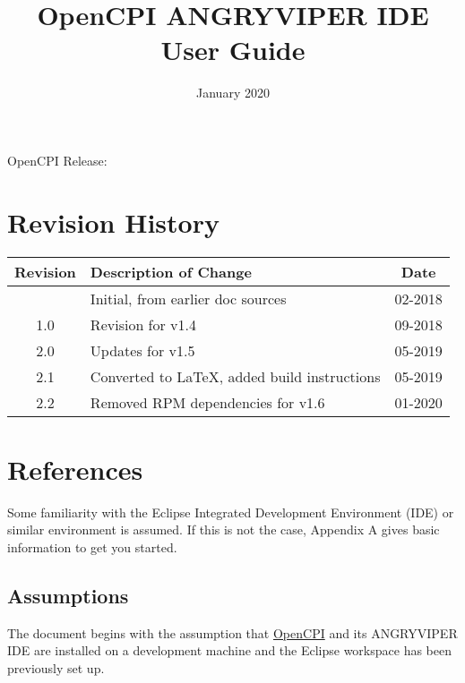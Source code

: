 \documentclass[10pt, a4paper, oneside]{article}
\begin{document}
\title {OpenCPI ANGRYVIPER IDE User Guide}
\author{}
\date{January 2020} %
\begin{titlepage}
\maketitle{} %
\begin{center}
OpenCPI Release: \ocpiversion
\end{center}
\end{titlepage}

\section{Revision History}
\renewcommand{\arraystretch}{2}
\begin{tabular}{|c|p{11cm}|c|}
\hline
Revision & Description of Change & Date\\
\hline
& Initial, from earlier doc sources & 02-2018\\ \hline
1.0 & Revision for v1.4& 09-2018\\  \hline
2.0 & Updates for v1.5 & 05-2019 \\\hline
2.1 & Converted to \LaTeX, added build instructions & 05-2019\\ \hline
2.2 & Removed RPM dependencies for v1.6 & 01-2020\\
\hline
\end{tabular}

\setcounter{tocdepth}{2}
\tableofcontents
{}
\newpage
\listoftables
\listoffigures
\newpage
{}
\section{References}
Some familiarity with the Eclipse Integrated Development Environment (IDE) or similar environment is assumed. If this is not the case, Appendix A gives basic information to get you started.

\subsection{Assumptions}
The document begins with the assumption that \href{https://gitlab.com/opencpi/opencpi}{OpenCPI} and its ANGRYVIPER IDE are installed on a development machine and the Eclipse workspace has been previously set up.
\end{document}
